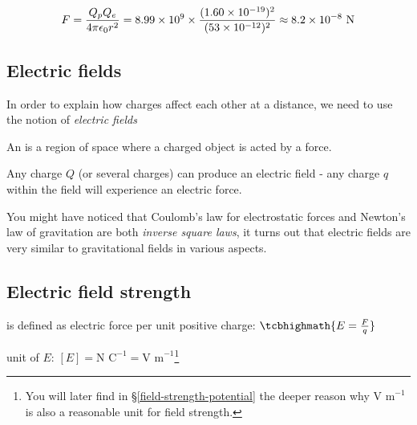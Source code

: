 \begin{soln}\begin{equation*}
	F = \frac{Q_p Q_e}{4\pi\epsilon_0 r^2} = 8.99\times10^9 \times \frac{(1.60\times10^{-19})^2}{(53\times10^{-12})^2} \approx 8.2 \times 10^{-8} \text{ N} 
\end{equation*}
\end{soln}


\subsection{Electric fields}

In order to explain how charges affect each other at a distance, we need to use the notion of \emph{electric fields}

\begin{ilight}
	An  is a region of space where a charged object is acted by a force.
\end{ilight}

Any charge $Q$ (or several charges) can produce an electric field - any charge $q$ within the field will experience an electric force.

\vspace*{\baselineskip}

You might have noticed that Coulomb's law for electrostatic forces and Newton's law of gravitation are both \emph{inverse square laws}, it turns out that electric fields are very similar to gravitational fields in various aspects.


\subsection{Electric field strength}

\rcyskip

\begin{ilight}
	 is defined as electric force per unit positive charge: $\tcbhighmath{E=\frac{F}{q}}$
\end{ilight}

\cmt unit of $E$: $[E]=\text{N C}^{-1} = \text{V m}^{-1}$\footnote{You will later find in \S\ref{field-strength-potential} the deeper reason why $\text{V m}^{-1}$ is also a reasonable unit for field strength.}

